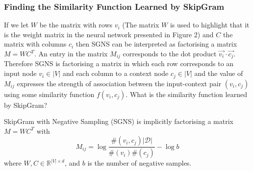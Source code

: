 \documentclass[a4paper]{article}
\begin{document}
\subsubsection{Finding the Similarity Function Learned by SkipGram}
If we let $W$ be the matrix with rows $v_i$ (The matrix $W$ is used to highlight
that it is the weight matrix in the neural network presented in Figure 2) and $C$ the matrix with columns
$c_i$ then SGNS can be interpreted as factorising a matrix $M = WC^T$. An entry in the matrix $M_{ij}$ corresponds to the dot product $\vec{v_i} \cdot
\vec{c_j}$. Therefore SGNS is factorising a matrix in which each row corresponds
to an input node $v_i \in |V|$ and each column to a context node $c_j \in |V|$ and the value of $M_{ij}$ expresses the
strength of association between the input-context pair $(v_i, c_j)$ using some similarity
function $f(v_i,c_j)$. What is the similarity function learned by SkipGram? 
\begin{theorem}
  SkipGram with Negative Sampling (SGNS) is implicitly factorising a matrix $M =
  WC^T$ with
  \[M_{ij} = \log{\frac{\#(v_i,c_j)|\mathcal{D}|}{\#(v_i)\#(c_j)}} - \log{b}\]
  where $W, C \in \mathbb{R}^{|V| \times d}$, and $b$ is the number of negative samples.
\end{theorem}
\end{document}
